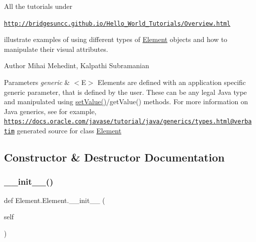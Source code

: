 All the tutorials under

\href{http://bridgesuncc.github.io/Hello_World_Tutorials/Overview.html}{\tt http\+://bridgesuncc.\+github.\+io/\+Hello\+\_\+\+World\+\_\+\+Tutorials/\+Overview.\+html}

illustrate examples of using different types of \hyperlink{class_element_1_1_element}{Element} objects and how to manipulate their visual attributes.

\begin{DoxyAuthor}{Author}
Mihai Mehedint, Kalpathi Subramanian
\end{DoxyAuthor}

\begin{DoxyParams}{Parameters}
{\em generic} & $<$\+E$>$ Elements are defined with an application specific generic parameter, that is defined by the user. These can be any legal Java type and manipulated using \hyperlink{class_element_1_1_element_a267a7f5770e823ca3b6e5bc88fa6dfa9}{set\+Value()}/get\+Value() methods. For more information on Java generics, see for example, \href{https://docs.oracle.com/javase/tutorial/java/generics/types.html@verbatim}{\tt https\+://docs.\+oracle.\+com/javase/tutorial/java/generics/types.\+html@verbatim} generated source for class \hyperlink{class_element_1_1_element}{Element}  \\
\hline
\end{DoxyParams}


\subsection{Constructor \& Destructor Documentation}
\hypertarget{class_element_1_1_element_a977b7da08b2c2ffb8d2f0c90e1fee284}{}\label{class_element_1_1_element_a977b7da08b2c2ffb8d2f0c90e1fee284} 
\subsubsection{\texorpdfstring{\+\_\+\+\_\+init\+\_\+\+\_\+()}{\_\_init\_\_()}}
{\footnotesize\ttfamily def Element.\+Element.\+\_\+\+\_\+init\+\_\+\+\_\+ (\begin{DoxyParamCaption}\item[{}]{self }\end{DoxyParamCaption})}




